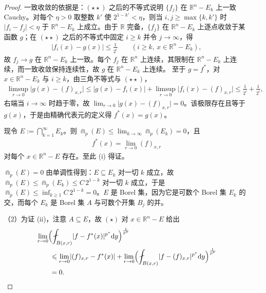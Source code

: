 \documentclass[../../main.tex]{subfiles}%
\begin{document}
\begin{proof}
一致收敛的依据是：$(\star\star)$ 之后的不等式说明 $\{f_j\}$ 在 $\mathbb{R}^n-E_k$ 上一致 Cauchy。对每个 $\eta>0$ 取整数 $k'$ 使 $2^{1-k'}<\eta$，则当 $i,j\geqslant\max\{k,k'\}$ 时 $\lvert f_i-f_j\rvert<\eta$ 于 $\mathbb{R}^n-E_k$ 上成立。由于 $\mathbb{R}$ 完备，$\{f_j\}$ 在 $\mathbb{R}^n-E_k$ 上逐点收敛于某函数 $g$；在 $(\star\star)$ 之后的不等式中固定 $i\geqslant k$ 并令 $j\to\infty$，得
\begin{align*}
\lvert f_i(x)-g(x)\rvert\leqslant\frac{1}{2^i}\qquad(i\geqslant k,\ x\in\mathbb{R}^n-E_k),
\end{align*}
故 $f_j\to g$ 在 $\mathbb{R}^n-E_k$ 上一致。每个 $f_j$ 在 $\mathbb{R}^n$ 上连续，其限制在 $\mathbb{R}^n-E_k$ 上连续，而一致收敛保持连续性，故 $g$ 在 $\mathbb{R}^n-E_k$ 上连续。
至于 $g=f^*$，对 $x\in\mathbb{R}^n-E_k$ 与 $i\geqslant k$，由三角不等式与 $(\star\star)$，
\begin{align*}
\limsup_{r\to0}\lvert g(x)-(f)_{x,r}\rvert\leqslant\lvert g(x)-f_i(x)\rvert+\limsup_{r\to0}\lvert f_i(x)-(f)_{x,r}\rvert\leqslant\frac{1}{2^i}+\frac{1}{2^i} ,
\end{align*}
右端当 $i\to\infty$ 时趋于零，故 $\lim_{r\to0}\lvert g(x)-(f)_{x,r}\rvert=0$。该极限存在且等于 $g(x)$，于是由精确代表元的定义得 $f^*(x)=g(x)$。

现令 $E:=\bigcap_{k=1}^{\infty}E_k$。则 $\Cap_p(E)\leqslant\lim_{k\to\infty}\Cap_p(E_k)=0$，且
\begin{align*}
f^*(x)=\lim_{r\to0}(f)_{x,r}
\end{align*}
对每个 $x\in\mathbb{R}^n-E$ 存在。至此 (i) 得证。

$\Cap_p(E)=0$ 由单调性得到：$E\subseteq E_k$ 对一切 $k$ 成立，故 $\Cap_p(E)\leqslant\Cap_p(E_k)\leqslant C\,2^{1-k}$ 对一切 $k$ 成立，于是 $\Cap_p(E)\leqslant\inf_{k\geqslant1}C\,2^{1-k}=0$。$E$ 是 Borel 集，因为它是可数个 Borel 集 $E_k$ 的交，而每个 $E_k$ 是 Borel 集 $A$ 与可数个开集 $B_j$ 的并。

（2）为证 (ii)，注意 $A\subseteq E$，故 $(\star)$ 对 $x\in\mathbb{R}^n-E$ 给出
\begin{align*}
&\lim_{r\to0}\Bigl(\fint_{B(x,r)}\lvert f-f^*(x)\rvert^{p^*}\diff y\Bigr)^{\frac{1}{p^*}}\\
&\qquad\leqslant\lim_{r\to0}\lvert(f)_{x,r}-f^*(x)\rvert+\lim_{r\to0}\Bigl(\fint_{B(x,r)}\lvert f-(f)_{x,r}\rvert^{p^*}\diff y\Bigr)^{\frac{1}{p^*}}\\
&\qquad=0 .
\end{align*}


\end{proof}
\end{document}
